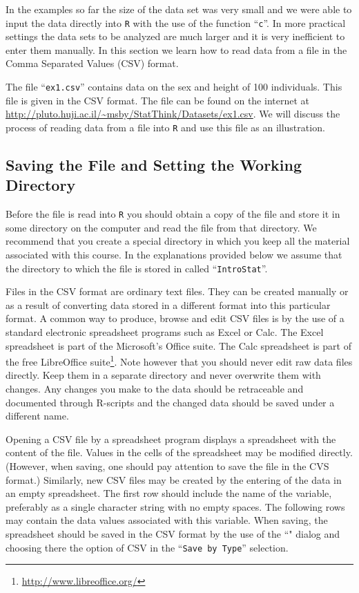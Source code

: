\documentclass[
]{krantz}
\renewcommand{\href}[2]{#2\footnote{\url{#1}}}
\theoremstyle{definition}
\theoremstyle{definition}
\theoremstyle{definition}
\theoremstyle{remark}
\begin{document}
In the examples so far the size of the data set was very small and we were able to input the data directly into \texttt{R} with the use of the function ``\texttt{c}''. In more practical settings the data sets to be analyzed are much larger and it is very inefficient to enter them manually. In this section we learn how to read data from a file in the Comma Separated Values (CSV) format.

The file ``\texttt{ex1.csv}'' contains data on the sex and height of 100 individuals. This file is given in the CSV format. The file can be found on the internet at \url{http://pluto.huji.ac.il/~msby/StatThink/Datasets/ex1.csv}. We will discuss the process of reading data from a file into \texttt{R} and use this file as an illustration.

\hypertarget{saving-the-file-and-setting-the-working-directory}{%
\subsection{Saving the File and Setting the Working Directory}\label{saving-the-file-and-setting-the-working-directory}}

Before the file is read into \texttt{R} you should obtain a copy of the file and store it in some directory on the computer and read the file from that directory. We recommend that you create a special directory in which you keep all the material associated with this course. In the explanations provided below we assume that the directory to which the file is stored in called ``\texttt{IntroStat}''.

Files in the CSV format are ordinary text files. They can be created manually or as a result of converting data stored in a different format into this particular format. A common way to produce, browse and edit CSV files is by the use of a standard electronic spreadsheet programs such as Excel or Calc. The Excel spreadsheet is part of the Microsoft's Office suite. The Calc spreadsheet is part of the free \href{http://www.libreoffice.org/}{LibreOffice suite}. Note however that you should never edit raw data files directly. Keep them in a separate directory and never overwrite them with changes. Any changes you make to the data should be retraceable and documented through R-scripts and the changed data should be saved under a different name.

Opening a CSV file by a spreadsheet program displays a spreadsheet with the content of the file. Values in the cells of the spreadsheet may be modified directly. (However, when saving, one should pay attention to save the file in the CVS format.) Similarly, new CSV files may be created by the entering of the data in an empty spreadsheet. The first row should include the name of the variable, preferably as a single character string with no empty spaces. The following rows may contain the data values associated with this variable. When saving, the spreadsheet should be saved in the CSV format by the use of the ``" dialog and choosing there the option of CSV in the ``\texttt{Save\ by\ Type}'' selection.
\end{document}
